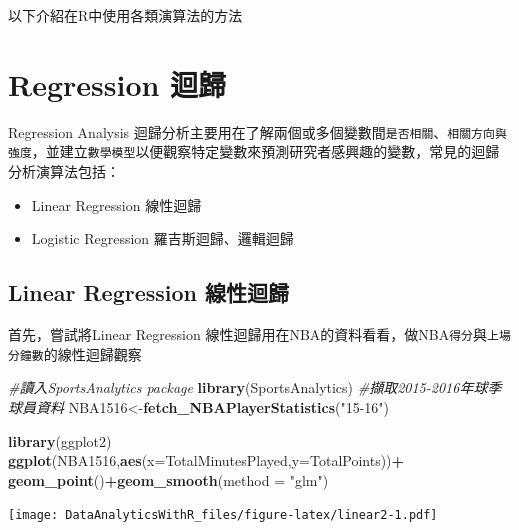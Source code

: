 \documentclass[
]{book}
\newenvironment{Shaded}{\begin{snugshade}}{\end{snugshade}}
\newcommand{\CommentTok}[1]{\textcolor[rgb]{0.56,0.35,0.01}{\textit{#1}}}
\newcommand{\DataTypeTok}[1]{\textcolor[rgb]{0.13,0.29,0.53}{#1}}
\newcommand{\KeywordTok}[1]{\textcolor[rgb]{0.13,0.29,0.53}{\textbf{#1}}}
\newcommand{\NormalTok}[1]{#1}
\newcommand{\OperatorTok}[1]{\textcolor[rgb]{0.81,0.36,0.00}{\textbf{#1}}}
\newcommand{\StringTok}[1]{\textcolor[rgb]{0.31,0.60,0.02}{#1}}
\providecommand{\tightlist}{%
  \setlength{\itemsep}{0pt}\setlength{\parskip}{0pt}}
\begin{document}
以下介紹在R中使用各類演算法的方法

\hypertarget{regression-ux8ff4ux6b78}{%
\section{Regression 迴歸}\label{regression-ux8ff4ux6b78}}

Regression Analysis 迴歸分析主要用在了解兩個或多個變數間\texttt{是否相關}、\texttt{相關方向與強度}，並建立\texttt{數學模型}以便觀察特定變數來預測研究者感興趣的變數，常見的迴歸分析演算法包括：

\begin{itemize}
\tightlist
\item
  Linear Regression 線性迴歸
\item
  Logistic Regression 羅吉斯迴歸、邏輯迴歸
\end{itemize}

\hypertarget{linear-regression-ux7ddaux6027ux8ff4ux6b78}{%
\subsection{Linear Regression 線性迴歸}\label{linear-regression-ux7ddaux6027ux8ff4ux6b78}}

首先，嘗試將Linear Regression 線性迴歸用在NBA的資料看看，做NBA\texttt{得分}與\texttt{上場分鐘數}的線性迴歸觀察

\begin{Shaded}
\begin{Highlighting}[]
\CommentTok{#讀入SportsAnalytics package}
\KeywordTok{library}\NormalTok{(SportsAnalytics)}
\CommentTok{#擷取2015-2016年球季球員資料}
\NormalTok{NBA1516<-}\KeywordTok{fetch_NBAPlayerStatistics}\NormalTok{(}\StringTok{"15-16"}\NormalTok{)}
\end{Highlighting}
\end{Shaded}

\begin{Shaded}
\begin{Highlighting}[]
\KeywordTok{library}\NormalTok{(ggplot2)}
\KeywordTok{ggplot}\NormalTok{(NBA1516,}\KeywordTok{aes}\NormalTok{(}\DataTypeTok{x=}\NormalTok{TotalMinutesPlayed,}\DataTypeTok{y=}\NormalTok{TotalPoints))}\OperatorTok{+}
\StringTok{    }\KeywordTok{geom_point}\NormalTok{()}\OperatorTok{+}\KeywordTok{geom_smooth}\NormalTok{(}\DataTypeTok{method =} \StringTok{"glm"}\NormalTok{)}
\end{Highlighting}
\end{Shaded}

\texttt{[image: DataAnalyticsWithR\_files/figure-latex/linear2-1.pdf]}
\end{document}
